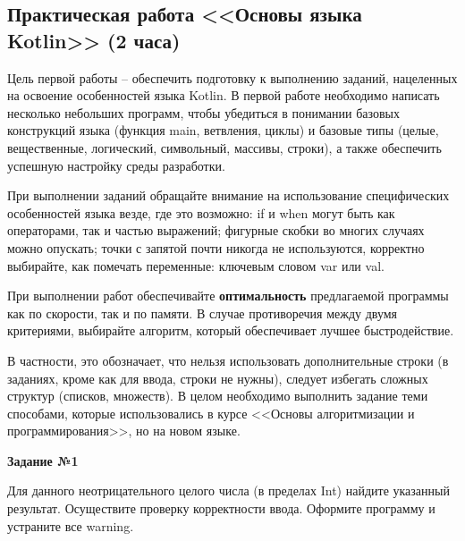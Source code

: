 \subsection{Практическая работа <<Основы языка Kotlin>> (2 часа)}

Цель первой работы -- обеспечить подготовку к выполнению заданий, 
нацеленных на освоение особенностей языка Kotlin. В первой работе
необходимо написать несколько небольших программ, чтобы убедиться в понимании
базовых конструкций языка (функция main, ветвления, циклы) и базовые типы (целые, вещественные, логический, символьный, массивы, строки), а также обеспечить успешную настройку среды разработки.

При выполнении заданий обращайте внимание на использование специфических особенностей языка везде, где это возможно: 
if и when могут быть как операторами, так и частью выражений; фигурные скобки во многих случаях можно опускать;
точки с запятой почти никогда не используются, корректно выбирайте, как помечать переменные: ключевым словом var или val.

При выполнении работ обеспечивайте \textbf{оптимальность} предлагаемой программы как по скорости, так и по памяти. В
случае противоречия между двумя критериями, выбирайте алгоритм, который обеспечивает лучшее быстродействие.

В частности, это обозначает, что нельзя использовать дополнительные строки (в заданиях, кроме как для ввода, строки не нужны),
следует избегать сложных структур (списков, множеств). В целом необходимо выполнить задание теми способами, которые использовались в 
курсе <<Основы алгоритмизации и программирования>>, но на новом языке.

\textbf{Задание №1} %


Для данного неотрицательного целого числа (в пределах Int)
найдите указанный результат. Осуществите проверку 
корректности ввода. Оформите программу и устраните все warning.

